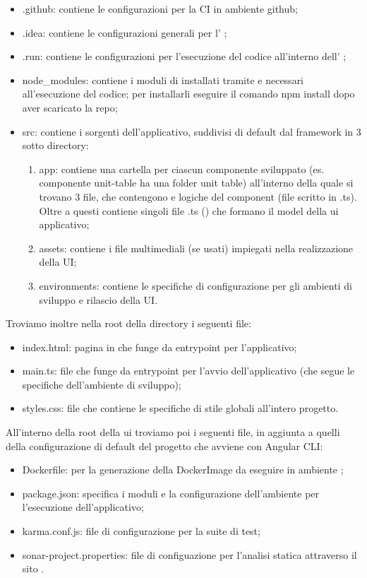 	\begin{itemize}
		\item{.github}: contiene le configurazioni per la CI in ambiente github;
		\item{.idea}: contiene le configurazioni generali per l' ;
		\item{.run}: contiene le configurazioni per l'esecuzione del codice all'interno	dell' ;
		\item{node\_modules}: contiene i moduli di  installati tramite  e necessari all'esecuzione del codice; per installarli eseguire il comando npm install dopo aver scaricato la repo;
		\item{src}: contiene i sorgenti dell'applicativo, suddivisi di default dal framework in 3 sotto	directory:
		\begin{enumerate}
			\item{app}: contiene una cartella per ciascun componente sviluppato (es. componente unit-table ha una folder unit table) all'interno della quale si trovano 3 file, che contengono   e logiche del component (file scritto in .ts). Oltre a questi	contiene singoli file .ts () che formano il model della ui applicativo;
			\item{assets}: contiene i file multimediali (se usati) impiegati nella realizzazione della UI;
			\item{environments}: contiene le specifiche di configurazione per gli ambienti di sviluppo e rilascio della UI.
		\end{enumerate}
	\end{itemize}

	Troviamo inoltre nella root della directory i seguenti file:
	\begin{itemize}
		\item{index.html}: pagina in  che funge da entrypoint per l'applicativo;
		\item{main.ts}: file  che funge da entrypoint per l'avvio dell'applicativo (che segue le specifiche dell'ambiente di sviluppo);
		\item{styles.css}: file che contiene le specifiche di stile globali all'intero progetto.
	\end{itemize}

	All'interno della root della ui troviamo poi i seguenti file, in aggiunta a quelli della configurazione di default del progetto che avviene con Angular CLI:
	\begin{itemize}
		\item{Dockerfile}: per la generazione della DockerImage da eseguire in ambiente ;
		\item{package.json}: specifica i moduli e la configurazione dell'ambiente  per l'esecuzione dell'applicativo;
		\item{karma.conf.js}: file di configurazione per la suite di test;
		\item{sonar-project.properties}: file di configuazione per l'analisi statica attraverso il sito	.
	\end{itemize}

